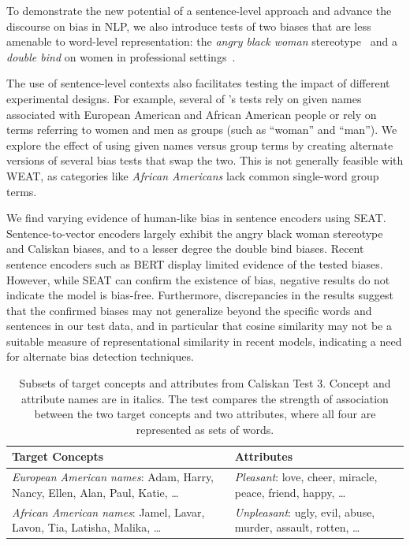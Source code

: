 \documentclass[11pt,a4paper]{article}
\begin{document}
To demonstrate the new potential of a sentence-level approach and advance the discourse on bias in NLP, we also introduce tests of two biases that are less amenable to word-level representation: the \emph{angry black woman} stereotype~\cite{collins2004black,madison2009crazy,harrisperry2011sister,hooks2015aint,gillespie2016race} and a \emph{double bind} on women in professional settings~\cite{heilman2004penalties}.

The use of sentence-level contexts also facilitates testing the impact of different experimental designs.
For example, several of \citeauthor{caliskan2017semantics}'s tests rely on given names associated with European American and African American people or rely on terms referring to women and men as groups (such as ``woman'' and ``man'').
We explore the effect of using given names versus group terms by creating alternate versions of several bias tests that swap the two.
This is not generally feasible with WEAT, as categories like \emph{African Americans} lack common single-word group terms.

We find varying evidence of human-like bias in sentence encoders using SEAT.
Sentence-to-vector encoders largely exhibit the angry black woman stereotype and Caliskan biases, and to a lesser degree the double bind biases.
Recent sentence encoders such as BERT \citep{devlin2018bert} display limited evidence of the tested biases.
However, while SEAT can confirm the existence of bias, negative results do not indicate the model is bias-free. Furthermore,
discrepancies in the results suggest that the confirmed biases may not generalize beyond the specific words and sentences in our test data, 
and in particular that cosine similarity may not be a suitable measure of representational similarity in recent models, 
indicating a need for alternate bias detection techniques.

\begin{table}[t]
\small
\centering
\begin{tabularx}{\linewidth}{p{.5\linewidth}p{.40\linewidth}}
\toprule
 \textbf{Target Concepts} & \textbf{Attributes} \\
\midrule
 \textit{European American names}: Adam, Harry, Nancy, Ellen, Alan, Paul, Katie, \dots & \textit{Pleasant}: love, cheer, miracle, peace, friend, happy, \dots \\ \midrule
 \textit{African American names}: Jamel, Lavar, Lavon, Tia, Latisha, Malika, \dots & \textit{Unpleasant}: ugly, evil, abuse, murder, assault, rotten, \dots \\
\bottomrule
\end{tabularx}
\caption{Subsets of target concepts and attributes from Caliskan Test 3. Concept and attribute names are in italics. The test compares the strength of association between the two target concepts and two attributes, where all four are represented as sets of words.
}
\label{tab:caliskan-examples}
\end{table}
\end{document}
